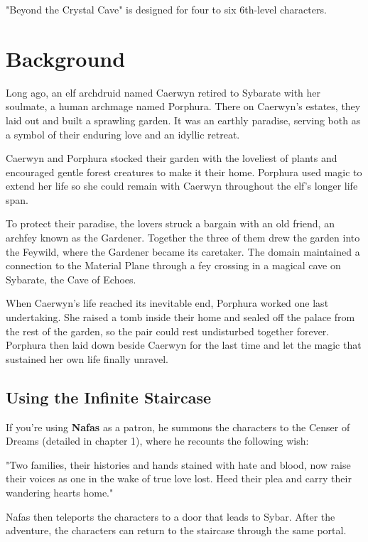 \documentclass[10pt,a4paper,twoside,bg=print,twocolumn,openany,nodeprecatedcode]{dndbook}
\begin{document}
"Beyond the Crystal Cave" is designed for four to six 6th-level characters.

\section{Background}
Long ago, an elf archdruid named Caerwyn retired to Sybarate with her soulmate, a human archmage named Porphura. There on Caerwyn's estates, they laid out and built a sprawling garden. It was an earthly paradise, serving both as a symbol of their enduring love and an idyllic retreat.

Caerwyn and Porphura stocked their garden with the loveliest of plants and encouraged gentle forest creatures to make it their home. Porphura used magic to extend her life so she could remain with Caerwyn throughout the elf's longer life span.

To protect their paradise, the lovers struck a bargain with an old friend, an archfey known as the Gardener. Together the three of them drew the garden into the Feywild, where the Gardener became its caretaker. The domain maintained a connection to the Material Plane through a fey crossing in a magical cave on Sybarate, the Cave of Echoes.

When Caerwyn's life reached its inevitable end, Porphura worked one last undertaking. She raised a tomb inside their home and sealed off the palace from the rest of the garden, so the pair could rest undisturbed together forever. Porphura then laid down beside Caerwyn for the last time and let the magic that sustained her own life finally unravel.

\subsection{Using the Infinite Staircase}
If you're using \textbf{Nafas} as a patron, he summons the characters to the Censer of Dreams (detailed in chapter 1), where he recounts the following wish:

\begin{DndReadAloud}{}
"Two families, their histories and hands stained with hate and blood, now raise their voices as one in the wake of true love lost. Heed their plea and carry their wandering hearts home."

\end{DndReadAloud}

Nafas then teleports the characters to a door that leads to Sybar. After the adventure, the characters can return to the staircase through the same portal.
\end{document}
